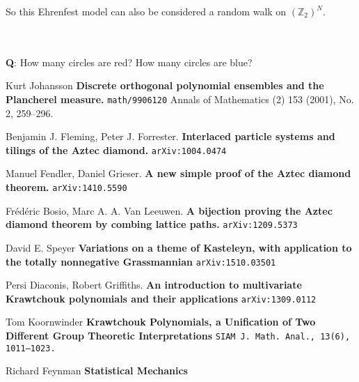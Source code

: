 \documentclass[12pt]{article}
\begin{document}
\newpage

\noindent So this Ehrenfest model can also be considered a random walk on $(\mathbb{Z}_2)^N$.  \\ \\
\textbf{Q}: How many circles are red? How many circles are blue?

\newpage

\selectfont \fontsize{12}{10}\selectfont

\begin{thebibliography}{}

\item Kurt Johansson \textbf{Discrete orthogonal polynomial ensembles and the Plancherel measure.} \texttt{math/9906120} Annals of Mathematics (2) 153 (2001), No. 2, 259--296.

\item Benjamin J. Fleming, Peter J. Forrester.  \textbf{Interlaced particle systems and tilings of the Aztec diamond.} \texttt{arXiv:1004.0474}

\item Manuel Fendler, Daniel Grieser.	 \textbf{A new simple proof of the Aztec diamond theorem.}  \texttt{arXiv:1410.5590} 

\item Fr\'{e}d\'{e}ric Bosio, Marc A. A. Van Leeuwen.  \textbf{A bijection proving the Aztec diamond theorem by combing lattice paths.} \texttt{arXiv:1209.5373}

\item David E. Speyer \textbf{Variations on a theme of Kasteleyn, with application to the totally nonnegative Grassmannian} \texttt{arXiv:1510.03501}

\item Persi Diaconis, Robert Griffiths.  \textbf{An introduction to multivariate Krawtchouk polynomials and their applications} \texttt{arXiv:1309.0112}

\item Tom Koornwinder \textbf{Krawtchouk Polynomials, a Unification of Two Different Group Theoretic Interpretations}
\texttt{SIAM J. Math. Anal., 13(6), 1011–1023.}

\item Richard Feynman \textbf{Statistical Mechanics} 

\end{thebibliography}
\end{document}
